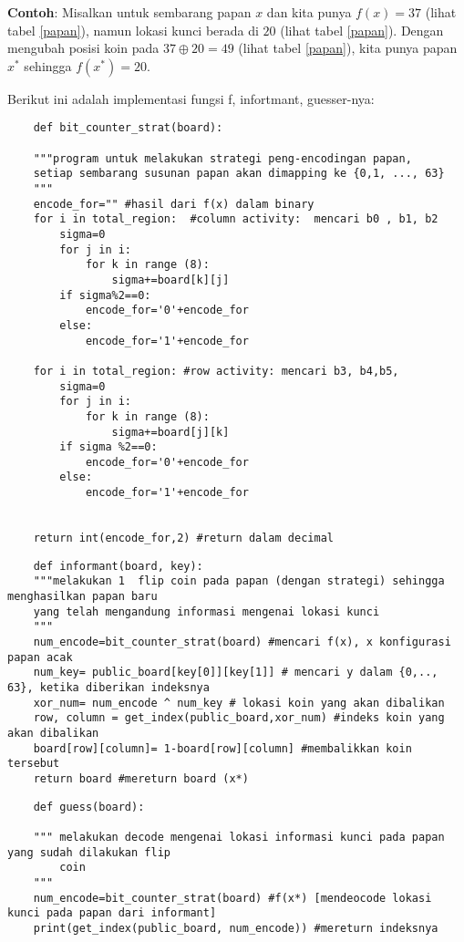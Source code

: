 \documentclass[12pt,letterpaper]{article}
\begin{document}
\textbf{Contoh}: Misalkan untuk sembarang papan $x$ dan kita punya $f(x)=37$ (lihat tabel \ref{papan}), namun lokasi kunci berada di $20$ (lihat tabel \ref{papan}).
Dengan mengubah posisi koin pada $37 \oplus 20 = 49 $ (lihat tabel \ref{papan}), kita punya papan $x^{*}$ sehingga $f(x^{*})=20$.

Berikut ini adalah implementasi fungsi f, infortmant, guesser-nya:

\begin{lstlisting}
    def bit_counter_strat(board):

    """program untuk melakukan strategi peng-encodingan papan,
    setiap sembarang susunan papan akan dimapping ke {0,1, ..., 63}
    """
    encode_for="" #hasil dari f(x) dalam binary
    for i in total_region:  #column activity:  mencari b0 , b1, b2
        sigma=0
        for j in i:
            for k in range (8):
                sigma+=board[k][j]
        if sigma%2==0:
            encode_for='0'+encode_for
        else:
            encode_for='1'+encode_for
    
    for i in total_region: #row activity: mencari b3, b4,b5,
        sigma=0
        for j in i:
            for k in range (8):
                sigma+=board[j][k]
        if sigma %2==0:
            encode_for='0'+encode_for
        else:
            encode_for='1'+encode_for

    
    return int(encode_for,2) #return dalam decimal

\end{lstlisting}
\begin{lstlisting}
    def informant(board, key):
    """melakukan 1  flip coin pada papan (dengan strategi) sehingga menghasilkan papan baru
    yang telah mengandung informasi mengenai lokasi kunci
    """
    num_encode=bit_counter_strat(board) #mencari f(x), x konfigurasi papan acak
    num_key= public_board[key[0]][key[1]] # mencari y dalam {0,.., 63}, ketika diberikan indeksnya
    xor_num= num_encode ^ num_key # lokasi koin yang akan dibalikan
    row, column = get_index(public_board,xor_num) #indeks koin yang akan dibalikan
    board[row][column]= 1-board[row][column] #membalikkan koin tersebut
    return board #mereturn board (x*)

\end{lstlisting}

\begin{lstlisting}
    def guess(board):

    """ melakukan decode mengenai lokasi informasi kunci pada papan yang sudah dilakukan flip
        coin
    """
    num_encode=bit_counter_strat(board) #f(x*) [mendeocode lokasi kunci pada papan dari informant]
    print(get_index(public_board, num_encode)) #mereturn indeksnya
\end{lstlisting}

\break
\end{document}
